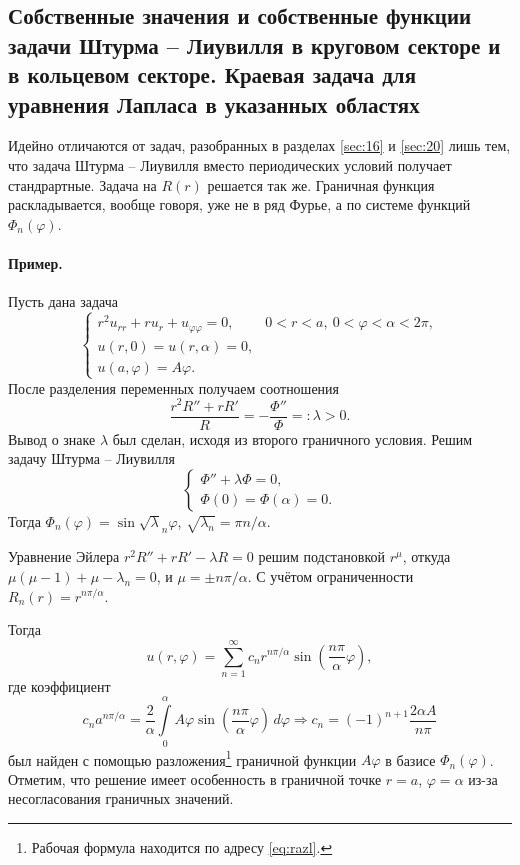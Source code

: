 \subsection{Собственные значения и собственные функции задачи Штурма -- Лиувилля в круговом секторе и в кольцевом секторе. Краевая задача для уравнения Лапласа в указанных областях}
Идейно отличаются от задач, разобранных в разделах \ref{sec:16} и \ref{sec:20}
лишь тем, что задача Штурма -- Лиувилля вместо периодических условий получает
стандрартные. Задача на $ R(r) $ решается так же. Граничная функция
раскладывается, вообще говоря, уже не в ряд Фурье, а по системе функций $
\Phi_n(\varphi) $.

\paragraph{Пример.} Пусть дана задача  
\[
  \begin{cases}
    r^2u_{rr} + ru_r + u_{\varphi\varphi} = 0, & 0 < r < a, \ 0 < \varphi <
    \alpha < 2\pi,\\
    u(r, 0) = u(r, \alpha) = 0,\\
    u(a, \varphi) = A\varphi.
  \end{cases}
\]
После разделения переменных получаем соотношения  
\[
    \frac{r^2 R'' + rR'}{R} =-\frac{\Phi''}{\Phi} =: \lambda > 0.
\]
Вывод о знаке $\lambda $ был сделан, исходя из второго граничного условия. Решим
задачу Штурма -- Лиувилля 
\[
  \begin{cases}
    \Phi'' + \lambda\Phi = 0,\\
    \Phi(0) = \Phi(\alpha) = 0.
  \end{cases}
\]
Тогда $ \Phi_n(\varphi) = \sin \sqrt\lambda_n\varphi $, $ \sqrt{\lambda_n} = \pi
n/\alpha$. 

Уравнение Эйлера $ r^2R'' + rR' - \lambda R = 0 $ решим подстановкой $ r^\mu $,
откуда $ \mu(\mu-1) + \mu - \lambda_n = 0 $, и $ \mu = \pm n\pi/\alpha $. С
учётом ограниченности $ R_n(r) = r^{n\pi/\alpha} $. 

Тогда  
\[
  u(r, \varphi) = \sum_{n=1}^\infty c_n r^{n\pi/\alpha}\sin \left(
  \frac{n\pi}{\alpha}\varphi \right),
\]
где коэффициент
\[
  c_na^{n\pi/\alpha} = \frac{2}{\alpha} \int\limits_{0}^{\alpha}A\varphi \sin
  \left( \frac{n\pi}{\alpha}\varphi \right) \,d\varphi \Rightarrow
  c_n = (-1)^{n+1} \frac{2\alpha A}{n\pi}
\]
был найден с помощью разложения\footnote{Рабочая формула находится по адресу
\eqref{eq:razl}.} граничной функции $ A\varphi $ в базисе $
\Phi_n(\varphi) $. Отметим, что решение имеет особенность в граничной точке $r =
a$, $\varphi = \alpha$
из-за несогласования граничных значений.
